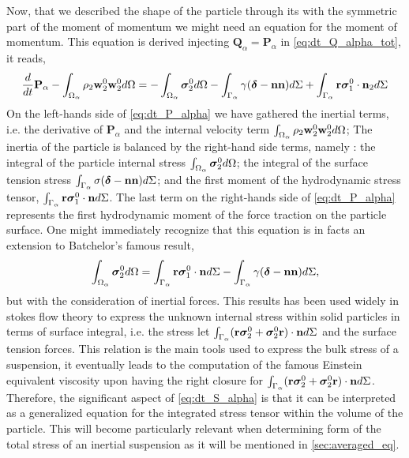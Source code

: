 Now, that we described the shape of the particle through its with the symmetric part of the moment of momentum we might need an equation for the moment of momentum. 
This equation is derived injecting $\textbf{Q}_\alpha = \textbf{P}_\alpha$ in \ref{eq:dt_Q_alpha_tot}, it reads, 
\begin{equation}
    \frac{d}{d t} {\textbf{P}_\alpha}
    - \int_{\Omega_\alpha}  \rho_2  \textbf{w}_2^0 \textbf{w}_2^0  d\Omega
    = 
    - \int_{\Omega_\alpha} \bm{\sigma}_2^0 d\Omega
    - \int_{\Gamma_\alpha}  
        \gamma (\bm\delta - \textbf{nn})
     d\Sigma
    + \int_{\Gamma_\alpha}  \textbf{r}\bm{\sigma}_1^0\cdot \textbf{n}_2 d\Sigma 
    \label{eq:dt_P_alpha}
\end{equation}
On the left-hands side of \ref{eq:dt_P_alpha} we have gathered the inertial terms, i.e. the derivative of $\textbf{P}_\alpha$ and the internal velocity term $\int_{\Omega_\alpha} \rho_2\textbf{w}_2^0\textbf{w}_2^0  d\Omega$; 
The inertia of the particle is balanced by the right-hand side terms, namely : 
the integral of the particle internal stress $\int_{\Omega_\alpha}  \bm{\sigma}_2^0 d\Omega$; 
the integral of the surface tension stress $\int_{\Gamma_\alpha}  \sigma (\bm\delta- \textbf{nn})  d\Sigma$; 
and the first moment of the hydrodynamic stress tensor, $\int_{\Gamma_\alpha} \textbf{r}\bm\sigma_1^0\cdot \textbf{n} d\Sigma$.
The last term on the right-hands side of \ref{eq:dt_P_alpha} represents the first hydrodynamic moment of the force traction on the particle surface.
One might immediately recognize that this equation is in facts an extension to Batchelor’s famous result, 
\begin{equation*}
    \int_{\Omega_\alpha} \bm{\sigma}_2^0 d\Omega
    = \int_{\Gamma_\alpha} \textbf{r}\bm\sigma_1^0\cdot \textbf{n} d\Sigma
    - \int_{\Gamma_\alpha} \gamma(\bm\delta - \textbf{nn}) d\Sigma,
\end{equation*}
but with the consideration of inertial forces.
This results has been used widely in stokes flow theory to express the unknown internal stress within solid particles in terms of surface integral, i.e. the stress let $\int_{\Gamma_\alpha} (\textbf{r}\bm\sigma_2^0+ \bm\sigma_2^0\textbf{r})\cdot \textbf{n} d\Sigma$ and the surface tension forces.
This relation is the main tools used to express the bulk stress of a suspension, it eventually leads to the computation of the famous Einstein equivalent viscosity upon having the right closure for $\int_{\Gamma_\alpha} (\textbf{r}\bm\sigma_2^0+ \bm\sigma_2^0\textbf{r})\cdot \textbf{n} d\Sigma$. 
Therefore, the significant aspect of \ref{eq:dt_S_alpha} is that it can be interpreted as a generalized equation for the integrated stress tensor within the volume of the particle.
This will become particularly relevant when determining form of the total stress of an inertial suspension as it will be mentioned in \ref{sec:averaged_eq}.

